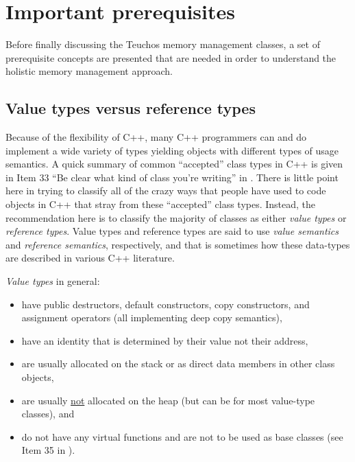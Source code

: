 \documentclass[pdf,ps2pdf,11pt]{SANDreport}
\begin{document}


%
{}\section{Important prerequisites}
\label{sec:important-prerequisites}
%

Before finally discussing the Teuchos memory management classes, a set
of prerequisite concepts are presented that are needed in order to
understand the holistic memory management approach.


%
{}\subsection{Value types versus reference types}
\label{sec:value-and-reference-types}
%

Because of the flexibility of C++, many C++ programmers can and do
implement a wide variety of types yielding objects with different
types of usage semantics.  A quick summary of common ``accepted''
class types in C++ is given in Item 33 ``Be clear what kind of class
you're writing'' in {}\cite{C++CodingStandards05}.  There is little
point here in trying to classify all of the crazy ways that people
have used to code objects in C++ that stray from these ``accepted''
class types.  Instead, the recommendation here is to classify the
majority of classes as either {}\textit{value types} or
{}\textit{reference types}.  Value types and reference types are said
to use {}\textit{value semantics} and {}\textit{reference semantics},
respectively, and that is sometimes how these data-types are described
in various C++ literature.

{}\textit{Value types} in general:

\begin{itemize}

{}\item have public destructors, default constructors, copy
constructors, and assignment operators (all implementing deep copy
semantics),

{}\item have an identity that is determined by their value not their
address,

{}\item are usually allocated on the stack or as direct data members
in other class objects,

{}\item are usually {}\underline{not} allocated on the heap (but can
be for most value-type classes), and

{}\item do not have any virtual functions and are not to be used as
base classes (see Item 35 in {}\cite{C++CodingStandards05}).

\end{itemize}
\end{document}
